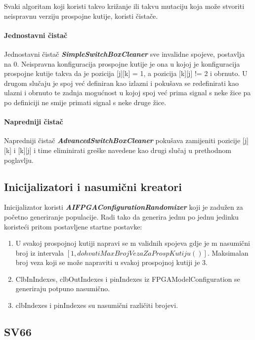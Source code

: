 \documentclass[times, utf8, zavrsni]{fer}
\begin{document}
	Svaki algoritam koji koristi takvo križanje ili takvu mutaciju koja može stvoriti neispravnu verziju prospojne kutije, koristi čistače. 
	
	\paragraph{Jednostavni čistač}
	
	Jednostavni čistač \textbf{\emph{SimpleSwitchBoxCleaner}} sve invalidne spojeve, postavlja na 0. Neispravna konfiguracija prospojne kutije je ona u kojoj je konfiguracija prospojne kutije takva da je pozicija [j][k] = 1, a pozicija [k][j] != 2 i obrnuto. U drugom slučaju je spoj već definiran kao izlazni i pokušava se redefinirati kao ulazni i obrnuto te zadnja mogućnost u kojoj spoj već prima signal s neke žice pa po definiciji ne smije primati signal s neke druge žice. 
	
	\paragraph{Napredniji čistač}
	
	Napredniji čistač \textbf{\emph{AdvancedSwitchBoxCleaner}} pokušava zamijeniti pozicije [j][k] i [k][j] i time eliminirati greške navedene kao drugi slučaj u prethodnom poglavlju.
	
	\subsection{Inicijalizatori i nasumični kreatori}
	
	Inicijalizator koristi \textbf{\emph{AIFPGAConfigurationRandomizer}} koji je zadužen za početno generiranje populacije. Radi tako da generira jednu po jednu jedinku koristeći pritom postavljene startne postavke:
	
	\begin{enumerate}
		\item U svakoj prospojnoj kutiji napravi se m validnih spojeva gdje je m nasumični broj iz intervala $[1, dohvatiMaxBrojVezaZaProspKutiju()]$. Maksimalan broj veza koji se može napraviti u svakoj prospojnoj kutiji je 3. 
		\item ClbInIndexes, clbOutIndexes i pinIndexes iz FPGAModelConfiguration se generiraju potpuno nasumično. 
		\item clbIndexes i pinIndexes su nasumični različiti brojevi. 
	\end{enumerate}
	
	
	\subsection{SV66}
	\label{SV66}
	
\end{document}

